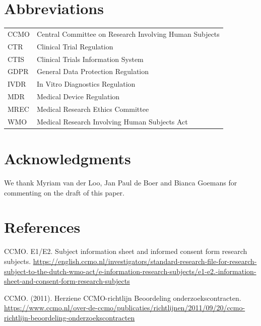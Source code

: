\documentclass[authordate, empirical]{jote-new-article}
\begin{document}
	\section{Abbreviations}

\begin{tabular}{l l}
	CCMO & Central Committee on Research 
	Involving Human Subjects \\
	CTR & Clinical Trial Regulation \\
	CTIS & Clinical Trials Information System \\
	GDPR & General Data Protection Regulation \\
	IVDR & In Vitro Diagnostics Regulation \\
	MDR & Medical Device Regulation \\
	MREC & Medical Research Ethics Committee \\
	WMO & Medical Research Involving Human Subjects Act
\end{tabular}









	\section{Acknowledgments}



	We thank Myriam van der Loo, Jan Paul de Boer and Bianca Goemans for commenting on the draft of this paper.



	\section{References}



	CCMO. {E1/E2. Subject information sheet and informed consent form research subjects}. \href{https://english.ccmo.nl/investigators/standard-research-file-for-research-subject-to-the-dutch-wmo-act/e-information-research-subjects/e1-e2.-information-sheet-and-consent-form-research-subjects}{https://english.ccmo.nl/investigators/standard-research-file-for-research-subject-to-the-dutch-wmo-act/e-information-research-subjects/e1-e2.-information-sheet-and-consent-form-research-subjects}



	CCMO. (2011). {Herziene CCMO-richtlijn Beoordeling onderzoekscontracten}. \href{https://www.ccmo.nl/over-de-ccmo/publicaties/richtlijnen/2011/09/20/ccmo-richtlijn-beoordeling-onderzoekscontracten}{https://www.ccmo.nl/over-de-ccmo/publicaties/richtlijnen/2011/09/20/ccmo-richtlijn-beoordeling-onderzoekscontracten}
\end{document}
